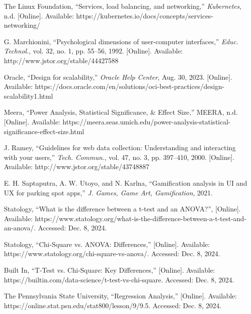 \documentclass[conference]{IEEEtran}
\begin{document}
\begin{thebibliography}{00}
 The Linux Foundation, ``Services, load balancing, and networking,'' \textit{Kubernetes}, n.d. [Online]. Available: https://kubernetes.io/docs/concepts/services-networking/

 G. Marchionini, ``Psychological dimensions of user-computer interfaces,'' \textit{Educ. Technol.}, vol. 32, no. 1, pp. 55–56, 1992. [Online]. Available: http://www.jstor.org/stable/44427588

 Oracle, ``Design for scalability,'' \textit{Oracle Help Center}, Aug. 30, 2023. [Online]. Available: https://docs.oracle.com/en/solutions/oci-best-practices/design-scalability1.html

 Meera, ``Power Analysis, Statistical Significance, \& Effect Size,'' MEERA, n.d. [Online]. Available: https://meera.seas.umich.edu/power-analysis-statistical-significance-effect-size.html

 J. Ramey, ``Guidelines for web data collection: Understanding and interacting with your users,'' \textit{Tech. Commun.}, vol. 47, no. 3, pp. 397–410, 2000. [Online]. Available: http://www.jstor.org/stable/43748887

 E. H. Saptaputra, A. W. Utoyo, and N. Karlna, ``Gamification analysis in UI and UX for parking spot apps,'' \textit{J. Games, Game Art, Gamification}, 2021.

 Statology, ``What is the difference between a t-test and an ANOVA?'', [Online]. Available: https://www.statology.org/what-is-the-difference-between-a-t-test-and-an-anova/. Accessed: Dec. 8, 2024.

 Statology, ``Chi-Square vs. ANOVA: Differences,'' [Online]. Available: https://www.statology.org/chi-square-vs-anova/. Accessed: Dec. 8, 2024.

 Built In, ``T-Test vs. Chi-Square: Key Differences,'' [Online]. Available: https://builtin.com/data-science/t-test-vs-chi-square. Accessed: Dec. 8, 2024.

 The Pennsylvania State University, ``Regression Analysis,'' [Online]. Available: https://online.stat.psu.edu/stat800/lesson/9/9.5. Accessed: Dec. 8, 2024.


\end{thebibliography}
\end{document}
